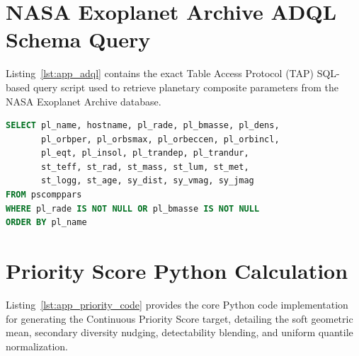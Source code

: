 \documentclass[11pt,a4paper]{article}
\begin{document}
\section{NASA Exoplanet Archive ADQL Schema Query}
\label{app:adql}

Listing~\ref{lst:app_adql} contains the exact Table Access Protocol (TAP) SQL-based query script used to retrieve planetary composite parameters from the NASA Exoplanet Archive database.

\begin{lstlisting}[language=SQL, caption={Composite planetary parameters query script}, label={lst:app_adql}]
SELECT pl_name, hostname, pl_rade, pl_bmasse, pl_dens,
       pl_orbper, pl_orbsmax, pl_orbeccen, pl_orbincl,
       pl_eqt, pl_insol, pl_trandep, pl_trandur,
       st_teff, st_rad, st_mass, st_lum, st_met,
       st_logg, st_age, sy_dist, sy_vmag, sy_jmag
FROM pscomppars
WHERE pl_rade IS NOT NULL OR pl_bmasse IS NOT NULL
ORDER BY pl_name
\end{lstlisting}

\newpage

\section{Priority Score Python Calculation}
\label{app:priority}

Listing~\ref{lst:app_priority_code} provides the core Python code implementation for generating the Continuous Priority Score target, detailing the soft geometric mean, secondary diversity nudging, detectability blending, and uniform quantile normalization.
\end{document}
